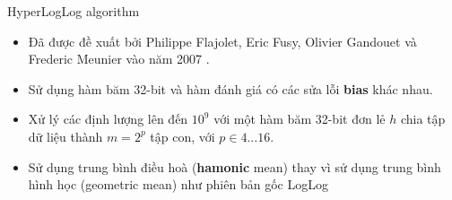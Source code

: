 \documentclass[10pt]{beamer}
\begin{document}
\begin{frame}{HyperLogLog algorithm}
\begin{itemize}
	\item Đã được đề xuất bởi Philippe Flajolet, Eric Fusy, Olivier Gandouet và 
  Frederic Meunier vào năm 2007 \cite{flajolet2007hyperloglog}.
  \item Sử dụng hàm băm 32-bit và hàm đánh giá có các sửa lỗi \textbf{bias} khác nhau.
  \item Xử lý các định lượng lên đến $10^9$ với một hàm băm 32-bit đơn lẻ $h$ chia tập dữ liệu thành $m = 2^p$ tập con, với $p \in 4...16$.
  \item Sử dụng trung bình điều hoà (\textbf{hamonic} mean) thay vì sử dụng trung bình hình học (geometric mean) như phiên bản gốc LogLog

\end{itemize}
\end{frame}
  
\end{document}
